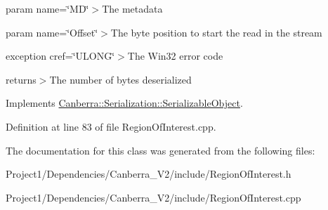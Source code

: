 param name=\char`\"{}\+M\+D\char`\"{}$>$The metadata

param name=\char`\"{}\+Offset\char`\"{}$>$The byte position to start the read in the stream

exception cref=\char`\"{}\+U\+L\+O\+N\+G\char`\"{}$>$The Win32 error code

returns$>$The number of bytes deserialized

Implements \hyperlink{class_canberra_1_1_serialization_1_1_serializable_object}{Canberra\+::\+Serialization\+::\+Serializable\+Object}.



Definition at line 83 of file Region\+Of\+Interest.\+cpp.



The documentation for this class was generated from the following files\+:\begin{DoxyCompactItemize}
\item 
Project1/\+Dependencies/\+Canberra\+\_\+\+V2/include/Region\+Of\+Interest.\+h\item 
Project1/\+Dependencies/\+Canberra\+\_\+\+V2/include/Region\+Of\+Interest.\+cpp\end{DoxyCompactItemize}
